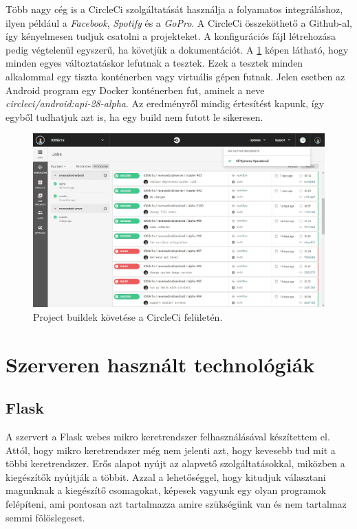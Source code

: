 \documentclass{thesis-ekf}
\theoremstyle{definition}
\theoremstyle{remark}
\begin{document}
Több nagy cég is a CircleCi szolgáltatását használja a folyamatos integráláshoz, ilyen például a \emph{Facebook}, \emph{Spotify} és a \emph{GoPro}.
A CircleCi összeköthető a Github-al, így kényelmesen tudjuk csatolni a projekteket.
A konfigurációs fájl létrehozása pedig végtelenül egyszerű, ha követjük a dokumentációt.
A \ref{circleci} képen látható, hogy minden egyes változtatáskor lefutnak a tesztek.
Ezek a tesztek minden alkalommal egy tiszta konténerben vagy virtuális gépen futnak.
Jelen esetben az Android program egy Docker konténerben fut, aminek a neve \emph{circleci/android:api-28-alpha}.
Az eredményről mindig értesítést kapunk, így egyből tudhatjuk azt is, ha egy build nem futott le sikeresen.


\begin{figure}[!h]
	\centering
	\includegraphics[width=15cm]{pictures/circleci}
	\caption{Project buildek követése a CircleCi felületén.}
	\label{circleci}
\end{figure}

\newpage

\section{Szerveren használt technológiák}\label{szerveren_hasznalt_technologiak}

\subsection{Flask}

A szervert a Flask webes mikro keretrendszer felhasználásával készítettem el.
Attól, hogy mikro keretrendszer még nem jelenti azt, hogy kevesebb tud mit a többi keretrendszer.
Erős alapot nyújt az alapvető szolgáltatásokkal, miközben a kiegészítők nyújtják a többit.
Azzal a lehetőséggel, hogy kitudjuk választani magunknak a kiegészítő csomagokat, képesek vagyunk egy olyan programok felépíteni, ami pontosan azt tartalmazza amire szükségünk van és nem tartalmaz semmi fölöslegeset.
\end{document}
